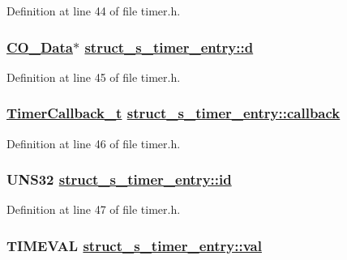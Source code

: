 Definition at line 44 of file timer.h.\hypertarget{structstruct__s__timer__entry_c08f4de0f4a517ce2bb72f18251cd13c}{
\subsubsection[d]{\setlength{\rightskip}{0pt plus 5cm}\hyperlink{structstruct__CO__Data}{CO\_\-Data}$\ast$ \hyperlink{structstruct__s__timer__entry_c08f4de0f4a517ce2bb72f18251cd13c}{struct\_\-s\_\-timer\_\-entry::d}}}
\label{structstruct__s__timer__entry_c08f4de0f4a517ce2bb72f18251cd13c}




Definition at line 45 of file timer.h.\hypertarget{structstruct__s__timer__entry_3aaad06b3f938b7af91b790a4dd30669}{
\subsubsection[callback]{\setlength{\rightskip}{0pt plus 5cm}\hyperlink{timer_8h_f7d102e060339d3730ceae5fea03691b}{Timer\-Callback\_\-t} \hyperlink{structstruct__s__timer__entry_3aaad06b3f938b7af91b790a4dd30669}{struct\_\-s\_\-timer\_\-entry::callback}}}
\label{structstruct__s__timer__entry_3aaad06b3f938b7af91b790a4dd30669}




Definition at line 46 of file timer.h.\hypertarget{structstruct__s__timer__entry_aaaa1955d3358bf87060856bdf834b61}{
\subsubsection[id]{\setlength{\rightskip}{0pt plus 5cm}UNS32 \hyperlink{structstruct__s__timer__entry_aaaa1955d3358bf87060856bdf834b61}{struct\_\-s\_\-timer\_\-entry::id}}}
\label{structstruct__s__timer__entry_aaaa1955d3358bf87060856bdf834b61}




Definition at line 47 of file timer.h.\hypertarget{structstruct__s__timer__entry_ab57b1903f3819bce5018173dfb9f999}{
\subsubsection[val]{\setlength{\rightskip}{0pt plus 5cm}TIMEVAL \hyperlink{structstruct__s__timer__entry_ab57b1903f3819bce5018173dfb9f999}{struct\_\-s\_\-timer\_\-entry::val}}}
\label{structstruct__s__timer__entry_ab57b1903f3819bce5018173dfb9f999}




